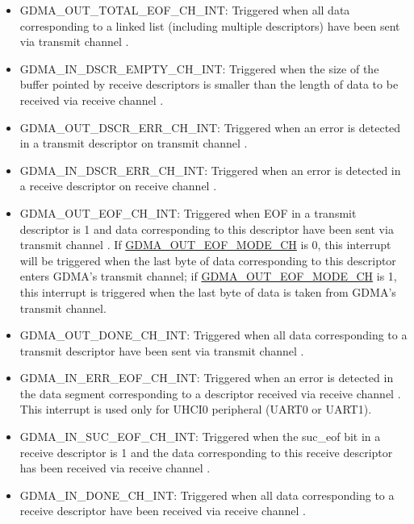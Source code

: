 \documentclass[main\_\_EN.tex]{subfiles}
\begin{document}
\begin{itemize}
\item \label{int:GDMAOUTTOTALEOFINT}GDMA\_OUT\_TOTAL\_EOF\_CH\_INT: Triggered when all data corresponding to a linked list (including multiple descriptors) have been sent via transmit channel .
\item \label{int:GDMAINDSCREMPTYINT}GDMA\_IN\_DSCR\_EMPTY\_CH\_INT: Triggered when the size of the buffer pointed by receive descriptors is smaller than the length of data to be received via receive channel .
\item \label{int:GDMAOUTDSCRERRINT}GDMA\_OUT\_DSCR\_ERR\_CH\_INT: Triggered when an error is detected in a transmit descriptor on transmit channel .
\item \label{int:GDMAINDSCRERRINT}GDMA\_IN\_DSCR\_ERR\_CH\_INT: Triggered when an error is detected in a receive descriptor on receive channel .
\item \label{int:GDMAOUTEOFINT}GDMA\_OUT\_EOF\_CH\_INT: Triggered when EOF in a transmit descriptor is 1 and data corresponding to this descriptor have been sent via transmit channel . If \hyperref[fielddesc:DMAOUTEOFMODECHN]{GDMA\_OUT\_EOF\_MODE\_CH} is 0, this interrupt will be triggered when the last byte of data corresponding to this descriptor enters GDMA's transmit channel; if \hyperref[fielddesc:DMAOUTEOFMODECHN]{GDMA\_OUT\_EOF\_MODE\_CH} is 1, this interrupt is triggered when the last byte of data is taken from GDMA's transmit channel.
\item \label{int:GDMAOUTDONEINT}GDMA\_OUT\_DONE\_CH\_INT: Triggered when all data corresponding to a transmit descriptor have been sent via transmit channel .
\item \label{int:GDMAINERREOFINT}GDMA\_IN\_ERR\_EOF\_CH\_INT: Triggered when an error is detected in the data segment corresponding to a descriptor received via receive channel . This interrupt is used only for UHCI0 peripheral (UART0 or UART1).
\item \label{int:GDMAINSUCEOFINT}GDMA\_IN\_SUC\_EOF\_CH\_INT: Triggered when the suc\_eof bit in a receive descriptor is 1 and the data corresponding to this receive descriptor has been received via receive channel .
\item \label{int:GDMAINDONEINT}GDMA\_IN\_DONE\_CH\_INT: Triggered when all data corresponding to a receive descriptor have been received via receive channel .
\end{itemize}
\end{document}
